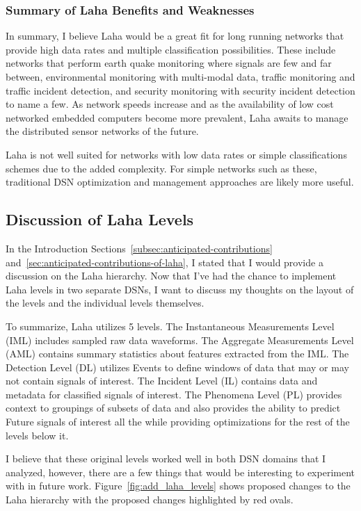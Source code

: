 \subsubsection{Summary of Laha Benefits and Weaknesses}
In summary, I believe Laha would be a great fit for long running networks that provide high data rates and multiple classification possibilities. These include networks that perform earth quake monitoring where signals are few and far between, environmental monitoring with multi-modal data, traffic monitoring and traffic incident detection, and security monitoring with security incident detection to name a few. As network speeds increase and as the availability of low cost networked embedded computers become more prevalent, Laha awaits to manage the distributed sensor networks of the future.

Laha is not well suited for networks with low data rates or simple classifications schemes due to the added complexity. For simple networks such as these, traditional DSN optimization and management approaches are likely more useful.

\subsection{Discussion of Laha Levels}\label{subsec:discussion-of-laha-levels}

In the Introduction Sections~\ref{subsec:anticipated-contributions} and~\ref{sec:anticipated-contributions-of-laha}, I stated that I would provide a discussion on the Laha hierarchy. Now that I've had the chance to implement Laha levels in two separate DSNs, I want to discuss my thoughts on the layout of the levels and the individual levels themselves.

To summarize, Laha utilizes 5 levels. The Instantaneous Measurements Level (IML) includes sampled raw data waveforms. The Aggregate Measurements Level (AML) contains summary statistics about features extracted from the IML. The Detection Level (DL) utilizes Events to define windows of data that may or may not contain signals of interest. The Incident Level (IL) contains data and metadata for classified signals of interest. The Phenomena Level (PL) provides context to groupings of subsets of data and also provides the ability to predict Future signals of interest all the while providing optimizations for the rest of the levels below it.

I believe that these original levels worked well in both DSN domains that I analyzed, however, there are a few things that would be interesting to experiment with in future work. Figure~\ref{fig:add_laha_levels} shows proposed changes to the Laha hierarchy with the proposed changes highlighted by red ovals.

